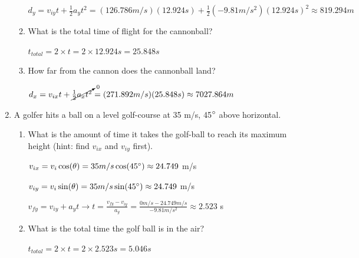 \documentclass[letterpaper, 12pt]{article}
\begin{document}
\begin{enumerate}
\begin{enumerate}
	\vspace{0.1in}
	\color{red}
	$d_y = v_{iy}t + \frac{1}{2}a_yt^2 = (126.786 m/s)(12.924 s) + \frac{1}{2}(-9.81 m/s^2)(12.924 s)^2 \approx 819.294 m $	
		\color{black}
	\vspace{0.1in}

	\item What is the total time of flight for the cannonball?
	
		\vspace{0.1in}
	\color{red}
	$t_{total} = 2 \times t = 2 \times 12.924 s = 25.848 s$
	
	\color{black}
		\vspace{0.1in}
	

	\item How far from the cannon does the cannonball land? 

			\vspace{0.1in}
	\color{red}
	$d_x = v_{ix}t + \cancelto{0}{\frac{1}{2}a_xt^2} = (271.892 m/s)(25.848s) \approx 7027.864 m$
	
	\color{black}

	\vspace{0.1in}

\end{enumerate}

\vspace{0.2in}
\item A golfer hits a ball on a level golf-course at 35 m/s, 45$\degree$ above horizontal.
\begin{enumerate}
	\item What is the amount of time it takes the golf-ball to reach its maximum height (hint: find $v_{ix}$ and $v_{iy}$ first).
	
		\vspace{0.1in}
	
	\color{red}
		$ v_{ix} = v_i \cos (\theta) = 35 m/s \cos (45 \degree )  \approx 24.749$  m/s
		
		$ v_{iy} = v_i \sin (\theta) = 35 m/s \sin (45 \degree )  \approx 24.749$  m/s
		
		$v_{fy} = v_{iy} + a_y t \longrightarrow t = \frac{v_{fy} - v_{iy}}{a_y} = \frac{0 m/s - 24.749 m/s}{-9.81 m/s^2} \approx 2.523 $ s
	\color{black}
	
		\vspace{0.1in}

	\item What is the total time the golf ball is in the air?

	\vspace{0.1in}
	\color{red}
		$t_{total} = 2 \times t = 2 \times 2.523 s = 5.046 s$
	\color{black}


\end{enumerate}
\end{enumerate}
\end{document}
